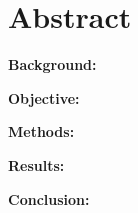 \section*{Abstract}

\textbf{Background:} 

\textbf{Objective:} 

\textbf{Methods:}

\textbf{Results:} 

\textbf{Conclusion:}